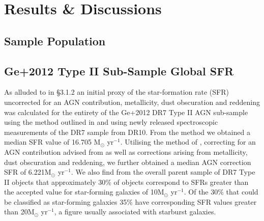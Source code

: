 \section{Results \& Discussions}
\subsection{Sample Population}
\subsection{Ge+2012 Type II Sub-Sample Global SFR}

As alluded to in §3.1.2 an initial proxy of the star-formation rate (SFR) uncorrected for an AGN contribution, metallicity, dust obscuration and reddening was calculated for the entirety of the Ge+2012 DR7 Type II AGN sub-sample using the method outlined in \cite{Kennicutt_1998} and using newly released spectroscopic measurements of the DR7 sample from DR10. From the \cite{Kennicutt_1998} method we obtained a median SFR value of 16.705 M$_{\odot}$ yr$^{-1}$. Utilising the method of \cite{Kewley_2004}, correcting for an AGN contribution advised from \cite{2006ApJ...642..702K} as well as corrections arising from metallicity, dust obscuration and reddening, we further obtained a median AGN correction SFR of 6.221M$_{\odot}$ yr$^{-1}$. We also find from the overall parent sample of DR7 Type II objects that approximately 30\% of objects correspond to SFRs greater than the accepted value for star-forming galaxies of 10M$_{\odot}$ yr$^{-1}$. Of the 30\% that could be classified as star-forming galaxies 35\% have corresponding SFR values greater than 20M$_{\odot}$ yr$^{-1}$, a figure usually associated with starburst galaxies.


